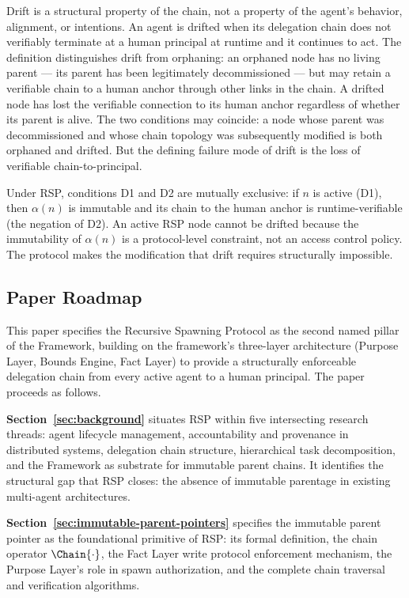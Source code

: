Drift is a structural property of the chain, not a property of the agent's behavior, alignment, or intentions. An agent is drifted when its delegation chain does not verifiably terminate at a human principal at runtime and it continues to act. The definition distinguishes drift from orphaning: an orphaned node has no living parent — its parent has been legitimately decommissioned — but may retain a verifiable chain to a human anchor through other links in the chain. A drifted node has lost the verifiable connection to its human anchor regardless of whether its parent is alive. The two conditions may coincide: a node whose parent was decommissioned and whose chain topology was subsequently modified is both orphaned and drifted. But the defining failure mode of drift is the loss of verifiable chain-to-principal.

Under RSP, conditions D1 and D2 are mutually exclusive: if $n$ is active (D1), then $\alpha(n)$ is immutable and its chain to the human anchor is runtime-verifiable (the negation of D2). An active RSP node cannot be drifted because the immutability of $\alpha(n)$ is a protocol-level constraint, not an access control policy. The protocol makes the modification that drift requires structurally impossible.

\subsection{Paper Roadmap}
\label{sec:roadmap}

This paper specifies the Recursive Spawning Protocol as the second named pillar of the \bxthree{} Framework, building on the framework's three-layer architecture (Purpose Layer, Bounds Engine, Fact Layer) to provide a structurally enforceable delegation chain from every active agent to a human principal. The paper proceeds as follows.

\textbf{Section~\ref{sec:background}} situates RSP within five intersecting research threads: agent lifecycle management, accountability and provenance in distributed systems, delegation chain structure, hierarchical task decomposition, and the \bxthree{} Framework as substrate for immutable parent chains. It identifies the structural gap that RSP closes: the absence of immutable parentage in existing multi-agent architectures.

\textbf{Section~\ref{sec:immutable-parent-pointers}} specifies the immutable parent pointer as the foundational primitive of RSP: its formal definition, the chain operator $\Chain{\cdot}$, the Fact Layer write protocol enforcement mechanism, the Purpose Layer's role in spawn authorization, and the complete chain traversal and verification algorithms.

